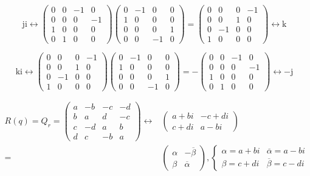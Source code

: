 \documentclass[
]{book}
\theoremstyle{definition}
\theoremstyle{definition}
\theoremstyle{definition}
\theoremstyle{definition}
\theoremstyle{remark}
\begin{document}
\[
\mathrm{j}\mathrm{i}\leftrightarrow\begin{pmatrix}0 & 0 & -1 & 0\\
0 & 0 & 0 & -1\\
1 & 0 & 0 & 0\\
0 & 1 & 0 & 0
\end{pmatrix}\begin{pmatrix}0 & -1 & 0 & 0\\
1 & 0 & 0 & 0\\
0 & 0 & 0 & 1\\
0 & 0 & -1 & 0
\end{pmatrix}=\begin{pmatrix}0 & 0 & 0 & -1\\
0 & 0 & 1 & 0\\
0 & -1 & 0 & 0\\
1 & 0 & 0 & 0
\end{pmatrix}\leftrightarrow\mathrm{k}
\]

\[
\mathrm{k}\mathrm{i}\leftrightarrow\begin{pmatrix}0 & 0 & 0 & -1\\
0 & 0 & 1 & 0\\
0 & -1 & 0 & 0\\
1 & 0 & 0 & 0
\end{pmatrix}\begin{pmatrix}0 & -1 & 0 & 0\\
1 & 0 & 0 & 0\\
0 & 0 & 0 & 1\\
0 & 0 & -1 & 0
\end{pmatrix}=-\begin{pmatrix}0 & 0 & -1 & 0\\
0 & 0 & 0 & -1\\
1 & 0 & 0 & 0\\
0 & 1 & 0 & 0
\end{pmatrix}\leftrightarrow-\mathrm{j}
\]

\[
\begin{aligned}
R\left(q\right)=Q_{{\scriptscriptstyle r}}=\begin{pmatrix}a & -b & -c & -d\\
b & a & d & -c\\
c & -d & a & b\\
d & c & -b & a
\end{pmatrix}\leftrightarrow & \begin{pmatrix}a+bi & -c+di\\
c+di & a-bi
\end{pmatrix}\\
= & \begin{pmatrix}\alpha & -\overline{\beta}\\
\beta & \overline{\alpha}
\end{pmatrix},\begin{cases}
\alpha=a+bi & \overline{\alpha}=a-bi\\
\beta=c+di & \overline{\beta}=c-di
\end{cases}
\end{aligned}
\]
\end{document}

